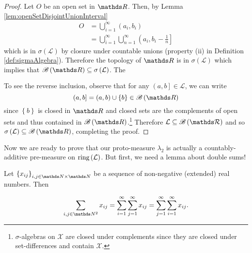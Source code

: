 \begin{proof}
Let $O$ be an open set in $\R$. Then, by Lemma \ref{lem:openSetDisjointUnionInterval}
\begin{align*}
O & =\bigcup_{i=1}^{\infty}\left(a_{i},b_{i}\right)\\
 & =\bigcup_{i=1}^{\infty}\bigcup_{n=1}^{\infty}\left(a_{i},b_{i}-\frac{1}{n}\right]
\end{align*}
which is in $\sigma\left(\mathcal{L}\right)$ by closure under countable
unions (property (ii) in Definition \ref{def:sigmaAlgebra}). Therefore
the topology of $\R$ is in $\sigma\left(\mathcal{L}\right)$ which
implies that $\borel\left(\R\right)\subseteq\sigma\left(\mathcal{L}\right)$.
The

To see the reverse inclusion, observe that for any $\left(a,b\right]\in\mathcal{L}$,
we can write
\[
\left(a,b\right]=\left(a,b\right)\cup\left\{ b\right\} \in\borel\left(\R\right)
\]
since $\left\{ b\right\} $ is closed in $\R$ and closed sets are
the complements of open sets and thus contained in $\borel\left(\R\right)$.\footnote{$\sigma$-algebras on $\mathcal{X}$ are closed under complements
since they are closed under set-differences and contain $\mathcal{X}$.} Therefore $\mathcal{L\subseteq\borel\left(\R\right)}$ and so $\sigma\left(\mathcal{L}\right)\subseteq\borel\left(\R\right)$,
completing the proof.
\end{proof}
Now we are ready to prove that our proto-measure $\lambda_{2}$ is
actually a countably-additive pre-measure on $\mathrm{ring}\left(\mathcal{L}\right)$.
But first, we need a lemma about double sums!
\begin{lem}
\label{lem:TonelliForSeries}Let $\left\{ x_{ij}\right\} _{i,j\in\N\times\N}$
be a sequence of non-negative (extended) real numbers. Then

\[
\sum_{i,j\in\N^{2}}x_{ij}=\sum_{i=1}^{\infty}\sum_{j=1}^{\infty}x_{ij}=\sum_{j=1}^{\infty}\sum_{i=1}^{\infty}x_{ij}.
\]
\end{lem}

